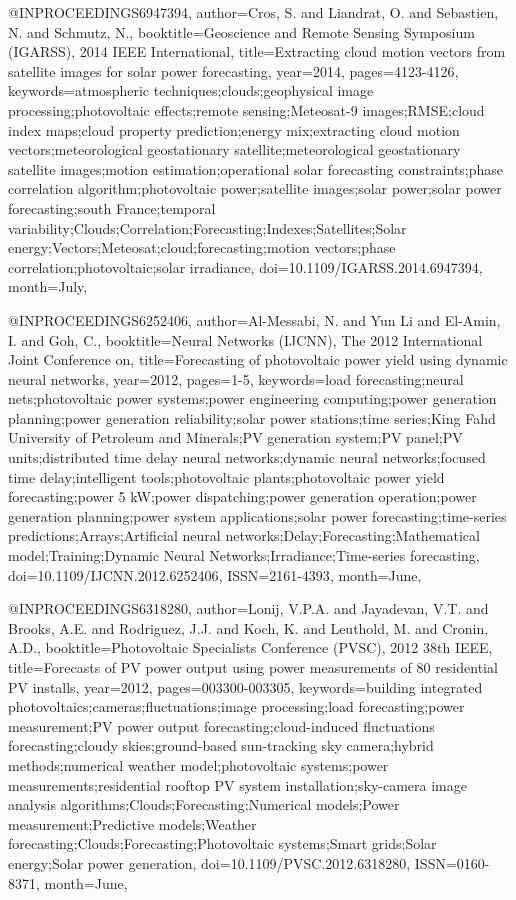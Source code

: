 @INPROCEEDINGS{6947394, 
author={Cros, S. and Liandrat, O. and Sebastien, N. and Schmutz, N.}, 
booktitle={Geoscience and Remote Sensing Symposium (IGARSS), 2014 IEEE International}, 
title={Extracting cloud motion vectors from satellite images for solar power forecasting}, 
year={2014}, 
pages={4123-4126}, 
keywords={atmospheric techniques;clouds;geophysical image processing;photovoltaic effects;remote sensing;Meteosat-9 images;RMSE;cloud index maps;cloud property prediction;energy mix;extracting cloud motion vectors;meteorological geostationary satellite;meteorological geostationary satellite images;motion estimation;operational solar forecasting constraints;phase correlation algorithm;photovoltaic power;satellite images;solar power;solar power forecasting;south France;temporal variability;Clouds;Correlation;Forecasting;Indexes;Satellites;Solar energy;Vectors;Meteosat;cloud;forecasting;motion vectors;phase correlation;photovoltaic;solar irradiance}, 
doi={10.1109/IGARSS.2014.6947394}, 
month={July},}

@INPROCEEDINGS{6252406, 
author={Al-Messabi, N. and Yun Li and El-Amin, I. and Goh, C.}, 
booktitle={Neural Networks (IJCNN), The 2012 International Joint Conference on}, 
title={Forecasting of photovoltaic power yield using dynamic neural networks}, 
year={2012}, 
pages={1-5}, 
keywords={load forecasting;neural nets;photovoltaic power systems;power engineering computing;power generation planning;power generation reliability;solar power stations;time series;King Fahd University of Petroleum and Minerals;PV generation system;PV panel;PV units;distributed time delay neural networks;dynamic neural networks;focused time delay;intelligent tools;photovoltaic plants;photovoltaic power yield forecasting;power 5 kW;power dispatching;power generation operation;power generation planning;power system applications;solar power forecasting;time-series predictions;Arrays;Artificial neural networks;Delay;Forecasting;Mathematical model;Training;Dynamic Neural Networks;Irradiance;Time-series forecasting}, 
doi={10.1109/IJCNN.2012.6252406}, 
ISSN={2161-4393}, 
month={June},}

@INPROCEEDINGS{6318280, 
author={Lonij, V.P.A. and Jayadevan, V.T. and Brooks, A.E. and Rodriguez, J.J. and Koch, K. and Leuthold, M. and Cronin, A.D.}, 
booktitle={Photovoltaic Specialists Conference (PVSC), 2012 38th IEEE}, 
title={Forecasts of PV power output using power measurements of 80 residential PV installs}, 
year={2012}, 
pages={003300-003305}, 
keywords={building integrated photovoltaics;cameras;fluctuations;image processing;load forecasting;power measurement;PV power output forecasting;cloud-induced fluctuations forecasting;cloudy skies;ground-based sun-tracking sky camera;hybrid methods;numerical weather model;photovoltaic systems;power measurements;residential rooftop PV system installation;sky-camera image analysis algorithms;Clouds;Forecasting;Numerical models;Power measurement;Predictive models;Weather forecasting;Clouds;Forecasting;Photovoltaic systems;Smart grids;Solar energy;Solar power generation}, 
doi={10.1109/PVSC.2012.6318280}, 
ISSN={0160-8371}, 
month={June},}

